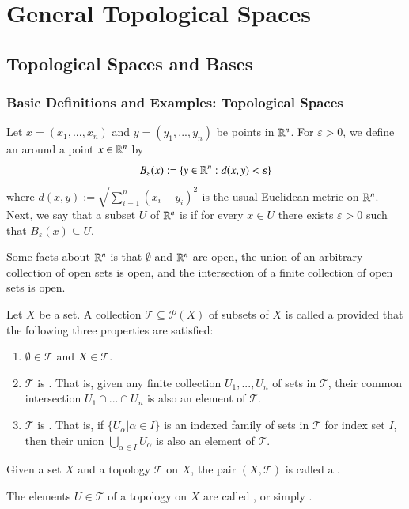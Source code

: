 \documentclass[12pt, a4paper, oneside, openright, titlepage]{book}
\begin{document}
\tableofcontents

\part{General Topological Spaces}

\chapter{ Topological Spaces and Bases}

\section{Basic Definitions and Examples: Topological Spaces}


\begin{example}
    Let $x = (x_1,...,x_n)$ and $y=(y_1,...,y_n)$ be points in $\mathbb R^n$. For $\varepsilon > 0$, we define an  around a point $x \in \mathbb R^n$ by \begin{equation*}
        B_{\varepsilon}(x) := \{y \in \mathbb R^n:d(x,y) < \varepsilon\}
    \end{equation*}
    where $d(x,y):=\sqrt{\sum_{i=1}^n(x_i-y_i)^2}$ is the usual Euclidean metric on $\mathbb R^n$. Next, we say that a subset $U$ of $\mathbb R^n$ is  if for every $x \in U$ there exists $\varepsilon > 0$ such that $B_{\varepsilon}(x) \subseteq U$. 

    Some facts about $\mathbb R^n$ is that $\emptyset$ and $\mathbb R^n$ are open, the union of an arbitrary collection of open sets is open, and the intersection of a finite collection of open sets is open. 
\end{example}

\begin{definition}
    Let $X$ be a set. A collection $\mathcal{T} \subseteq \mathcal{P}(X)$ of subsets of $X$ is called a  provided that the following three properties are satisfied: \begin{enumerate}
        \item $\emptyset \in \mathcal{T}$ and $X \in \mathcal{T}$.
        \item $\mathcal{T}$ is . That is, given any finite collection $U_1,...,U_n$ of sets in $\mathcal{T}$, their common intersection $U_1\cap ...\cap U_n$ is also an element of $\mathcal{T}$.
        \item $\mathcal{T}$ is . That is, if $\{U_{\alpha}\vert\alpha\in I\}$ is an indexed family of sets in $\mathcal{T}$ for index set $I$, then their union $\bigcup_{\alpha \in I}U_{\alpha}$ is also an element of $\mathcal{T}$.
    \end{enumerate}
    Given a set $X$ and a topology $\mathcal{T}$ on $X$, the pair $(X,\mathcal{T})$ is called a . 


    The elements $U \in \mathcal{T}$ of a topology on $X$ are called , or simply .
\end{definition}
\end{document}
